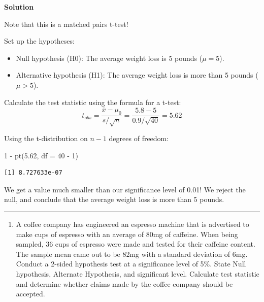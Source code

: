 \documentclass[
  letterpaper,
  DIV=11,
  numbers=noendperiod,
  oneside]{scrreprt}
\newenvironment{Shaded}{\begin{snugshade}}{\end{snugshade}}
\newcommand{\AttributeTok}[1]{\textcolor[rgb]{0.40,0.45,0.13}{#1}}
\newcommand{\DecValTok}[1]{\textcolor[rgb]{0.68,0.00,0.00}{#1}}
\newcommand{\FloatTok}[1]{\textcolor[rgb]{0.68,0.00,0.00}{#1}}
\newcommand{\FunctionTok}[1]{\textcolor[rgb]{0.28,0.35,0.67}{#1}}
\newcommand{\NormalTok}[1]{\textcolor[rgb]{0.00,0.23,0.31}{#1}}
\newcommand{\SpecialCharTok}[1]{\textcolor[rgb]{0.37,0.37,0.37}{#1}}
\providecommand{\tightlist}{%
  \setlength{\itemsep}{0pt}\setlength{\parskip}{0pt}}\usepackage{longtable,booktabs,array}
\begin{document}
\textbf{Solution}

Note that this is a matched pairs t-test!

Set up the hypotheses:

\begin{itemize}
\tightlist
\item
  Null hypothesis (H0): The average weight loss is 5 pounds
  (\(\mu = 5\)).
\item
  Alternative hypothesis (H1): The average weight loss is more than 5
  pounds (\(\mu > 5\)).
\end{itemize}

Calculate the test statistic using the formula for a t-test: \[
t_{obs} = \frac{\bar x - \mu_0}{s/\sqrt{n}} = \frac{5.8 - 5}{0.9/\sqrt{40}} = 5.62
\]

Using the t-distribution on \(n - 1\) degrees of freedom:

\begin{Shaded}
\begin{Highlighting}[]
\DecValTok{1} \SpecialCharTok{{-}} \FunctionTok{pt}\NormalTok{(}\FloatTok{5.62}\NormalTok{, }\AttributeTok{df =} \DecValTok{40} \SpecialCharTok{{-}} \DecValTok{1}\NormalTok{)}
\end{Highlighting}
\end{Shaded}

\begin{verbatim}
[1] 8.727633e-07
\end{verbatim}

We get a value much smaller than our significance level of 0.01! We
reject the null, and conclude that the average weight loss is more than
5 pounds.

\begin{center}\rule{0.5\linewidth}{0.5pt}\end{center}

\begin{enumerate}
\def\labelenumi{\arabic{enumi}.}
\setcounter{enumi}{2}
\tightlist
\item
  A coffee company has engineered an espresso machine that is advertised
  to make cups of espresso with an average of 80mg of caffeine. When
  being sampled, 36 cups of espresso were made and tested for their
  caffeine content. The sample mean came out to be 82mg with a standard
  deviation of 6mg. Conduct a 2-sided hypothesis test at a significance
  level of 5\%. State Null hypothesis, Alternate Hypothesis, and
  significant level. Calculate test statistic and determine whether
  claims made by the coffee company should be accepted.
\end{enumerate}
\end{document}
